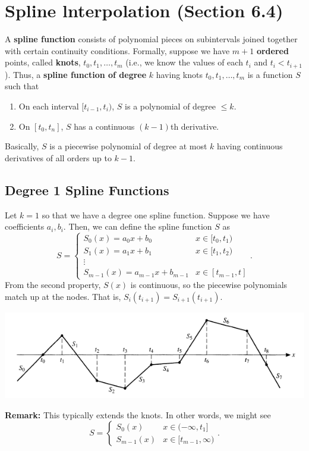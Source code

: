 \documentclass[letterpaper]{article}
\begin{document}
\section{Spline lnterpolation (Section 6.4)}
A \textbf{spline function} consists of polynomial pieces on subintervals joined together with certain continuity conditions. Formally, suppose we have $m + 1$ \textbf{ordered} points, called \textbf{knots}, $t_0, t_1, \hdots, t_m$ (i.e., we know the values of each $t_i$ and $t_i < t_{i + 1}$). Thus, a \textbf{spline function of degree} $k$ having knots $t_0, t_1, \hdots, t_m$ is a function $S$ such that 
\begin{enumerate}
    \item On each interval $[t_{i - 1}, t_i)$, $S$ is a polynomial of degree $\leq k$.
    \item On $[t_0, t_n]$, $S$ has a continuous $(k - 1)$th derivative.
\end{enumerate}
Basically, $S$ is a piecewise polynomial of degree at most $k$ having continuous derivatives of all orders up to $k - 1$. 

\subsection{Degree 1 Spline Functions}
Let $k = 1$ so that we have a degree one spline function. Suppose we have coefficients $a_i, b_i$. Then, we can define the spline function $S$ as 
\[S = \begin{cases}
    S_{0}(x) = a_0 x + b_0 & x \in [t_0, t_1) \\ 
    S_{1}(x) = a_1 x + b_1 & x \in [t_1, t_2) \\ 
    \vdots \\ 
    S_{m - 1}(x) = a_{m - 1}x + b_{m - 1} & x \in [t_{m - 1}, t]
\end{cases}.\]
From the second property, $S(x)$ is continuous, so the piecewise polynomials match up at the nodes. That is, $\boxed{S_{i}(t_{i + 1}) = S_{i + 1}(t_{i + 1}).}$
\begin{center}
    \includegraphics[scale=0.6]{../assets/spline.png}
\end{center}
\textbf{Remark:} This typically extends the knots. In other words, we might see 
\[S = \begin{cases}
    S_{0}(x) & x \in (-\infty, t_1] \\ 
    S_{m - 1}(x) & x \in [t_{m - 1}, \infty)
\end{cases}.\]
\end{document}
